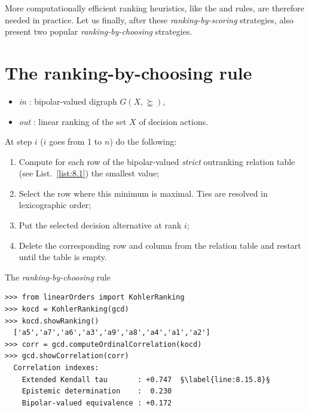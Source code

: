 More computationally efficient ranking heuristics, like the \Copeland and \NetFlows rules, are therefore needed in practice. Let us finally, after these \emph{ranking-by-scoring} strategies, also present two popular \emph{ranking-by-choosing} strategies.

\section{The \Kohler ranking-by-choosing rule}
\label{sec:8.6}

\begin{algorithm}
  {\footnotesize
\begin{itemize}
 \item [] \emph{in} : bipolar-valued digraph $G(X,\succnsim)$,
 \item [] \emph{out} : linear ranking of the set $X$ of decision actions.
\end{itemize}
At step $i$ ($i$ goes from 1 to $n$) do the following:
\begin{enumerate}[leftmargin=0.5cm,rightmargin=0.5cm,topsep=1pt]
\item Compute for each row of the bipolar-valued \emph{strict} outranking relation table (see List.~\vref{list:8.1}) the smallest value;
\item Select the row where this minimum is maximal. Ties are resolved in lexicographic order;
\item Put the selected decision alternative at rank $i$;
\item Delete the corresponding row and column from the relation table and restart until the table is empty.
\end{enumerate}
}
\caption{The \Kohler \emph{ranking-by-choosing} rule \citep{KOH-1978}}
\label{alg:8.3}
\end{algorithm}

\begin{lstlisting}[caption={Computing a \Kohler ranking},label=list:8.15]   
>>> from linearOrders import KohlerRanking
>>> kocd = KohlerRanking(gcd)
>>> kocd.showRanking()
  ['a5','a7','a6','a3','a9','a8','a4','a1','a2']
>>> corr = gcd.computeOrdinalCorrelation(kocd)
>>> gcd.showCorrelation(corr)
  Correlation indexes:
    Extended Kendall tau       : +0.747  §\label{line:8.15.8}§
    Epistemic determination    :  0.230
    Bipolar-valued equivalence : +0.172
\end{lstlisting}

